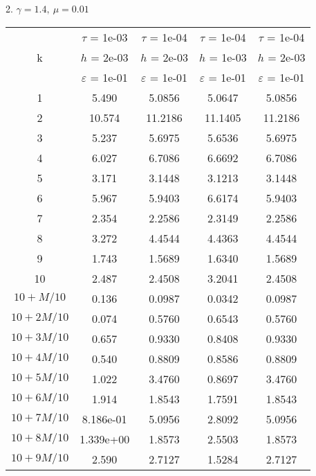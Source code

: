 2. $\gamma = 1.4, \ \mu = 0.01$
\begin{center}
	\begin{tabular}{ |c|c|c|c|c| } 
		\hline
		& $\tau$ = 1e-03 & $\tau$ = 1e-04 & $\tau$ = 1e-04 & $\tau$ = 1e-04 \\ 
		k & $h$ = 2e-03 & $h$ = 2e-03 & $h$ = 1e-03 & $h$ = 2e-03 \\ 
		& $\varepsilon$ = 1e-01 & $\varepsilon$ = 1e-01 & $\varepsilon$ = 1e-01 & $\varepsilon$ = 1e-01 \\ 
		\hline
		1 & 5.490 & 5.0856 & 5.0647 & 5.0856 \\
		\hline
		2 & 10.574 & 11.2186 & 11.1405 & 11.2186 \\
		\hline
		3 & 5.237 & 5.6975 & 5.6536 & 5.6975 \\
		\hline
		4 & 6.027 & 6.7086 & 6.6692 & 6.7086 \\
		\hline
		5 & 3.171 & 3.1448 & 3.1213 & 3.1448 \\
		\hline
		6 & 5.967 & 5.9403 & 6.6174 & 5.9403 \\
		\hline
		7 & 2.354 & 2.2586 & 2.3149 & 2.2586 \\
		\hline
		8 & 3.272 & 4.4544 & 4.4363 & 4.4544 \\
		\hline
		9 & 1.743 & 1.5689 & 1.6340 & 1.5689 \\
		\hline
		10 & 2.487 & 2.4508 & 3.2041 & 2.4508 \\
		\hline
		$10 + M/10$ & 0.136 & 0.0987 & 0.0342 & 0.0987 \\
		\hline
		$10 + 2M/10$ & 0.074 & 0.5760 & 0.6543 & 0.5760 \\
		\hline
		$10 + 3M/10$ & 0.657 & 0.9330 & 0.8408 & 0.9330 \\
		\hline
		$10 + 4M/10$ & 0.540 & 0.8809 & 0.8586 & 0.8809 \\
		\hline
		$10 + 5M/10$ & 1.022 & 3.4760 & 0.8697 & 3.4760 \\
		\hline
		$10 + 6M/10$ & 1.914 & 1.8543 & 1.7591 & 1.8543 \\
		\hline
		$10 + 7M/10$ & 8.186e-01 & 5.0956 & 2.8092 & 5.0956 \\
		\hline
		$10 + 8M/10$ & 1.339e+00 & 1.8573 & 2.5503 & 1.8573 \\
		\hline
		$10 + 9M/10$ & 2.590 & 2.7127 & 1.5284 & 2.7127 \\
		\hline
	\end{tabular}
\end{center}

